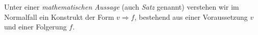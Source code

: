 \documentclass[../../main.tex]{subfiles}
\begin{document}
	
	\begin{definition}
		\label{def:MathematischeAussage}
		Unter einer \textit{mathematischen Aussage} (auch \textit{Satz} genannt) verstehen wir im Normalfall ein Konstrukt der Form $v \Rightarrow f$, bestehend aus einer Voraussetzung $v$ und einer Folgerung $f$.
	\end{definition}
\end{document}
